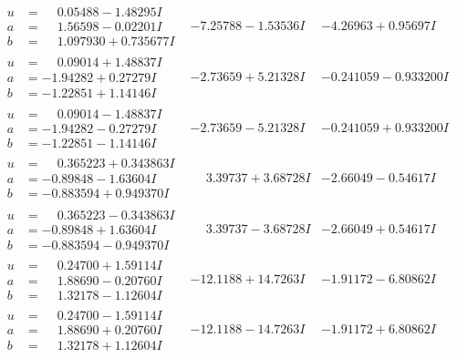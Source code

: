 \documentclass[1p]{elsarticle_modified}
\theoremstyle{definition}
\begin{document}
$$\begin{array}{c|c|c}
\begin{aligned}
u &= \phantom{-}0.05488 - 1.48295 I \\
a &= \phantom{-}1.56598 - 0.02201 I \\
b &= \phantom{-}1.097930 + 0.735677 I\end{aligned}
 & -7.25788 - 1.53536 I & -4.26963 + 0.95697 I \\ \hline\begin{aligned}
u &= \phantom{-}0.09014 + 1.48837 I \\
a &= -1.94282 + 0.27279 I \\
b &= -1.22851 + 1.14146 I\end{aligned}
 & -2.73659 + 5.21328 I & -0.241059 - 0.933200 I \\ \hline\begin{aligned}
u &= \phantom{-}0.09014 - 1.48837 I \\
a &= -1.94282 - 0.27279 I \\
b &= -1.22851 - 1.14146 I\end{aligned}
 & -2.73659 - 5.21328 I & -0.241059 + 0.933200 I \\ \hline\begin{aligned}
u &= \phantom{-}0.365223 + 0.343863 I \\
a &= -0.89848 - 1.63604 I \\
b &= -0.883594 + 0.949370 I\end{aligned}
 & \phantom{-}3.39737 + 3.68728 I & -2.66049 - 0.54617 I \\ \hline\begin{aligned}
u &= \phantom{-}0.365223 - 0.343863 I \\
a &= -0.89848 + 1.63604 I \\
b &= -0.883594 - 0.949370 I\end{aligned}
 & \phantom{-}3.39737 - 3.68728 I & -2.66049 + 0.54617 I \\ \hline\begin{aligned}
u &= \phantom{-}0.24700 + 1.59114 I \\
a &= \phantom{-}1.88690 - 0.20760 I \\
b &= \phantom{-}1.32178 - 1.12604 I\end{aligned}
 & -12.1188 + 14.7263 I & -1.91172 - 6.80862 I \\ \hline\begin{aligned}
u &= \phantom{-}0.24700 - 1.59114 I \\
a &= \phantom{-}1.88690 + 0.20760 I \\
b &= \phantom{-}1.32178 + 1.12604 I\end{aligned}
 & -12.1188 - 14.7263 I & -1.91172 + 6.80862 I \\ \hline\begin{aligned}

\end{aligned}
\end{array}$$
\end{document}
